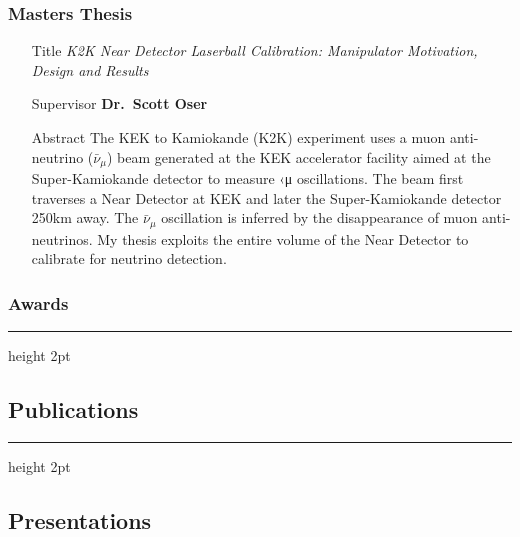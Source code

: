 \documentclass[12pt,a4paper]{article}
\newcommand{\colorrule}[1]
{
  {\color{#1}\hrule height 2pt}
  \vspace{1.0em}
}
\begin{document}
\subsubsection*{Masters Thesis}
\begin{itemize}
	\item[Title]
	{\it K2K Near Detector Laserball Calibration: Manipulator Motivation, Design
	 and Results}
	\item[Supervisor]
	{\bf Dr.\ Scott Oser}
	\item[Abstract]
	{\small The KEK to Kamiokande (K2K) experiment uses a muon anti-neutrino
	($\bar{\nu}_\mu$) beam generated at the KEK accelerator facility aimed at the
	Super-Kamiokande detector to measure ‹μ oscillations. The beam first traverses
	a Near Detector at KEK and later the Super-Kamiokande detector 250km away. The
	$\bar{\nu}_\mu$ oscillation is inferred by the disappearance of muon
	anti-neutrinos. My thesis exploits the entire volume of the Near Detector to
	calibrate for neutrino detection.}
\end{itemize}

\subsubsection*{Awards}



\colorrule{NavyBlue}
\subsection*{Publications}

\colorrule{NavyBlue}
\subsection*{Presentations}
\end{document}

